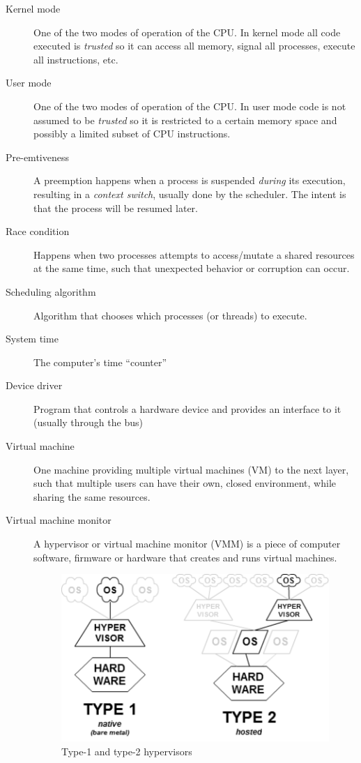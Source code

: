 \documentclass{article}
\begin{document}
\begin{description}
\item[Kernel mode]
  One of the two modes of operation of the CPU. In kernel mode all code executed is \textit{trusted} so it can access all memory, signal all processes, execute all instructions, etc.

\item[User mode]
  One of the two modes of operation of the CPU. In user mode code is not assumed to be \textit{trusted} so it is restricted to a certain memory space and possibly a limited subset of CPU instructions.

\item[Pre-emtiveness]
  A preemption happens when a process is suspended \textit{during} its execution, resulting in a \textit{context switch}, usually done by the scheduler. The intent is that the process will be resumed later.

\item[Race condition]
  Happens when two processes attempts to access/mutate a shared resources at the same time, such that unexpected behavior or corruption can occur.

\item[Scheduling algorithm]
  Algorithm that chooses which processes (or threads) to execute.

\item[System time]
  The computer's time ``counter''

\item[Device driver]
  Program that controls a hardware device and provides an interface to it (usually through the bus)

\item[Virtual machine]
  One machine providing multiple virtual machines (VM) to the next layer, such that multiple users can have their own, closed environment, while sharing the same resources.

\item[Virtual machine monitor]
  A hypervisor or virtual machine monitor (VMM) is a piece of computer software, firmware or hardware that creates and runs virtual machines.
\begin{figure}[H]
  \centering
  \includegraphics[scale=0.5]{images/hypervisor}
  \caption{Type-1 and type-2 hypervisors}
\end{figure}


\end{description}
\end{document}
